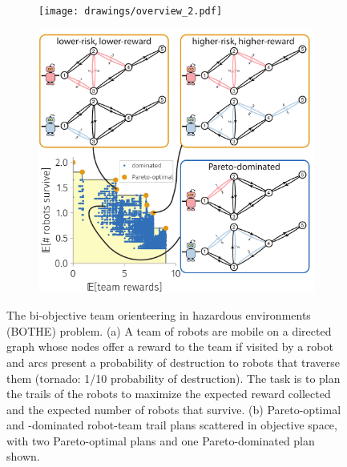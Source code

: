 \documentclass[11pt, oneside]{article}
\begin{document}
\begin{figure}[h!]
    \centering
     \begin{subfigure}[b]{0.62\textwidth}
    	\texttt{[image: drawings/overview\_2.pdf]}
	\caption{} \label{fig:overview}
    \end{subfigure}
    \begin{subfigure}[b]{0.66\textwidth}
    	\includegraphics[width=\textwidth]{drawings/toy_pareto_front2.pdf}
	\caption{} \label{fig:pareto_optimal}
    \end{subfigure}
    \caption{
      The bi-objective team orienteering in hazardous environments (BOTHE) problem.
      (a) A team of robots are mobile on a directed graph whose 
      nodes offer a reward to the team if visited by a robot and 
      arcs present a probability of destruction to robots that traverse them (tornado: 1/10 probability of destruction). The task is to plan the trails of the robots to maximize the expected reward collected and the expected number of robots that survive.
      (b) Pareto-optimal and -dominated robot-team trail plans scattered in objective space, with two Pareto-optimal plans and one Pareto-dominated plan shown.}
\end{figure}
\end{document}

